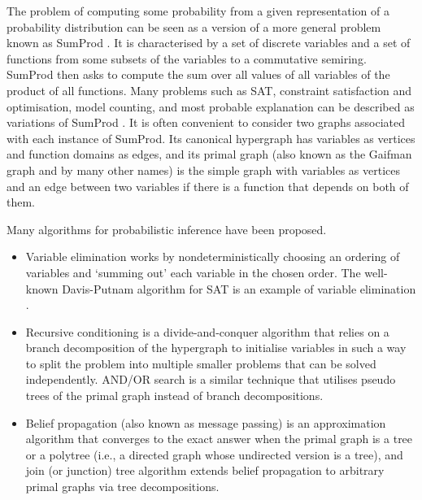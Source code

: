 \documentclass{article}
\begin{document}
The problem of computing some probability from a given representation of a
probability distribution can be seen as a version of a more general problem
known as SumProd
\cite{DBLP:journals/jair/BacchusDP09,DBLP:journals/ai/Dechter99}. It is
characterised by a set of discrete variables and a set of functions from some
subsets of the variables to a commutative semiring. SumProd then asks to compute
the sum over all values of all variables of the product of all functions. Many
problems such as SAT, constraint satisfaction and optimisation, model counting,
and most probable explanation can be described as variations of SumProd
\cite{DBLP:journals/jair/BacchusDP09,DBLP:journals/ai/Dechter99}. It is often
convenient to consider two graphs associated with each instance of SumProd. Its
canonical hypergraph has variables as vertices and function domains as edges,
and its primal graph (also known as the Gaifman graph and by many other names)
is the simple graph with variables as vertices and an edge between two variables
if there is a function that depends on both of them.

Many algorithms for probabilistic inference have been proposed.
\begin{itemize}
\item Variable elimination \cite{DBLP:journals/ai/Dechter99} works by
  nondeterministically choosing an ordering of variables and `summing out' each
  variable in the chosen order. The well-known
  Davis-Putnam algorithm \cite{DBLP:journals/jacm/DavisP60} for SAT is an
  example of variable elimination \cite{DBLP:journals/jair/BacchusDP09}.
\item Recursive conditioning \cite{DBLP:journals/ai/Darwiche01} is a
  divide-and-conquer algorithm that relies on a branch decomposition of the
  hypergraph to initialise variables in such a way to split the problem into
  multiple smaller problems that can be solved independently. AND/OR search
  \cite{DBLP:journals/ai/DechterM07,nilsson1980principles} is a similar
  technique that utilises pseudo trees of the primal graph instead of branch
  decompositions.
\item Belief propagation (also known as message passing)
  \cite{DBLP:conf/aaai/Pearl82} is an approximation algorithm that converges to
  the exact answer when the primal graph is a tree or a polytree (i.e., a
  directed graph whose undirected version is a tree), and join (or junction)
  tree algorithm \cite{lauritzen1988local} extends belief propagation to
  arbitrary primal graphs via tree decompositions.
\end{itemize}
\end{document}
